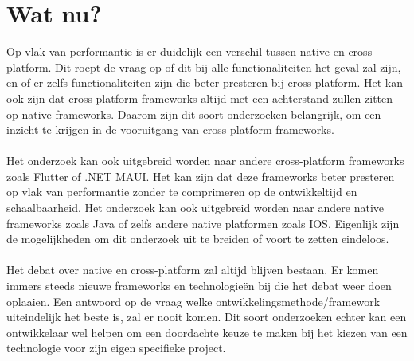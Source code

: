 \section{Wat nu?}
Op vlak van performantie is er duidelijk een verschil tussen native en cross-platform. 
Dit roept de vraag op of dit bij alle functionaliteiten het geval zal zijn, 
en of er zelfs functionaliteiten zijn die beter presteren bij cross-platform. 
Het kan ook zijn dat cross-platform frameworks altijd met een achterstand zullen zitten op native frameworks.
Daarom zijn dit soort onderzoeken belangrijk, om een inzicht te krijgen in de vooruitgang van cross-platform frameworks.
\\\\
Het onderzoek kan ook uitgebreid worden naar andere cross-platform frameworks zoals Flutter of 
.NET MAUI. Het kan zijn dat deze frameworks beter presteren op vlak van performantie zonder te 
comprimeren op de ontwikkeltijd en schaalbaarheid. Het onderzoek kan ook uitgebreid worden 
naar andere native frameworks zoals Java of zelfs andere native platformen zoals IOS. 
Eigenlijk zijn de mogelijkheden om dit onderzoek uit te breiden of voort te zetten eindeloos.
\\\\
Het debat over native en cross-platform zal altijd blijven bestaan. Er komen immers steeds nieuwe frameworks
en technologieën bij die het debat weer doen oplaaien. Een antwoord op de vraag welke 
ontwikkelingsmethode/framework uiteindelijk het beste is, zal er nooit komen. Dit soort onderzoeken 
echter kan een ontwikkelaar wel helpen om een doordachte keuze te maken 
bij het kiezen van een technologie voor zijn eigen specifieke project.







